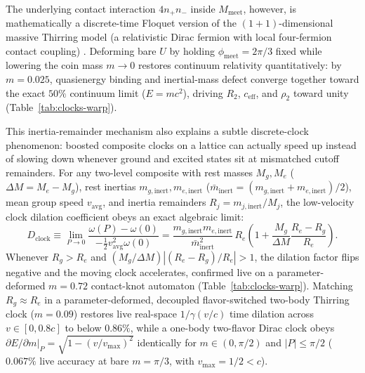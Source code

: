 The underlying contact interaction $4 n_+ n_-$ inside $M_{\mathrm{meet}}$, however, is mathematically a discrete-time
Floquet version of the $(1+1)$-dimensional massive Thirring model (a relativistic Dirac fermion with local four-fermion
contact coupling) \cite{thirring1958}. Deforming bare $U$ by holding $\phi_{\mathrm{meet}} = 2\pi/3$ fixed while lowering
the coin mass $m \to 0$ restores continuum relativity quantitatively: by $m = 0.025$, quasienergy binding and
inertial-mass defect converge together toward the exact $50\%$ continuum limit ($E = mc^2$), driving $R_2$,
$c_{\mathrm{eff}}$, and $\rho_2$ toward unity (Table~\ref{tab:clocks-warp}).

This inertia-remainder mechanism also explains a subtle discrete-clock phenomenon: boosted composite clocks on a lattice
can actually speed up instead of slowing down whenever ground and excited states sit at mismatched cutoff remainders. For
any two-level composite with rest masses $M_g, M_e$ ($\Delta M = M_e - M_g$), rest inertias
$m_{g,\mathrm{inert}}, m_{e,\mathrm{inert}}$ ($\bar{m}_{\mathrm{inert}} = (m_{g,\mathrm{inert}} +
m_{e,\mathrm{inert}})/2$), mean group speed $v_{\mathrm{avg}}$, and inertia remainders $R_j = m_{j,\mathrm{inert}}/M_j$,
the low-velocity clock dilation coefficient obeys an exact algebraic limit:
\begin{equation}
D_{\mathrm{clock}}
\equiv \lim_{P \to 0}\frac{\omega(P) - \omega(0)}{-\frac{1}{2} v_{\mathrm{avg}}^2 \omega(0)}
= \frac{m_{g,\mathrm{inert}} m_{e,\mathrm{inert}}}{\bar{m}_{\mathrm{inert}}^2}\, R_e
\left(1 + \frac{M_g}{\Delta M}\frac{R_e - R_g}{R_e}\right).
\label{eq:anti-dilation-law}
\end{equation}
Whenever $R_g > R_e$ and $(M_g/\Delta M)|(R_e - R_g)/R_e| > 1$, the dilation factor flips negative and the moving clock
accelerates, confirmed live on a parameter-deformed $m = 0.72$ contact-knot automaton (Table~\ref{tab:clocks-warp}).
Matching $R_g \approx R_e$ in a parameter-deformed, decoupled flavor-switched two-body Thirring clock ($m = 0.09$)
restores live real-space $1/\gamma(v/c)$ time dilation across $v \in [0, 0.8c]$ to below $0.86\%$, while a one-body
two-flavor Dirac clock obeys $\partial E / \partial m|_P = \sqrt{1 - (v / v_{\max})^2}$ identically for
$m \in (0, \pi/2)$ and $|P| \le \pi/2$ ($0.067\%$ live accuracy at bare $m = \pi/3$, with $v_{\max} = 1/2 < c$).

